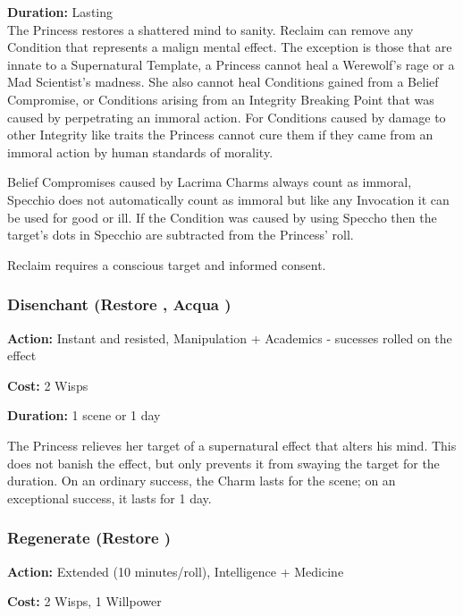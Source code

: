 \noindent \textbf{Duration:} Lasting \\

\noindent The Princess restores a shattered mind to sanity. Reclaim can remove any Condition that represents a malign mental effect. The exception is those that are innate to a Supernatural Template, a Princess cannot heal a Werewolf's rage or a Mad Scientist's madness. She also cannot heal Conditions gained from a Belief Compromise, or Conditions arising from an Integrity Breaking Point that was caused by perpetrating an immoral action. For Conditions caused by damage to other Integrity like traits the Princess cannot cure them if they came from an immoral action by human standards of morality. 

Belief Compromises caused by Lacrima Charms always count as immoral, Specchio does not automatically count as immoral but like any Invocation it can be used for good or ill. If the Condition was caused by using Speccho then the target's dots in Specchio are subtracted from the Princess' roll.

Reclaim requires a conscious target and informed consent.

\subsubsection*{Disenchant (Restore \textbullet\textbullet\textbullet\textbullet, Acqua \textbullet\textbullet\textbullet\textbullet)}

\noindent \textbf{Action:} Instant and resisted, Manipulation + Academics - sucesses rolled on the effect

\noindent \textbf{Cost:} 2 Wisps

\noindent \textbf{Duration:} 1 scene or 1 day

The Princess relieves her target of a supernatural effect that alters his mind. This does not banish the effect, but only prevents it from swaying the target for the duration. On an ordinary success, the Charm lasts for the scene; on an exceptional success, it lasts for 1 day.

\subsubsection*{Regenerate (Restore \textbullet\textbullet\textbullet\textbullet)}

\noindent \textbf{Action:} Extended (10 minutes/roll), Intelligence  + Medicine

\noindent \textbf{Cost:} 2 Wisps, 1 Willpower

